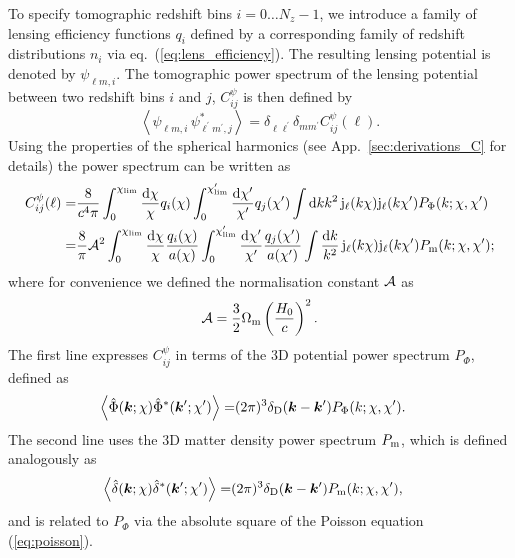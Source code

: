 \documentclass[fleqn,usenatbib]{mnras} %
\newcommand{\pref}{{\cal A}}
\renewcommand{\vec}{\bm}
\begin{document}
To specify tomographic redshift bins $i=0\ldots N_z-1$, we introduce a family
of lensing efficiency functions $q_i$ defined by a corresponding family of
redshift distributions $n_i$ via eq.~(\ref{eq:lens_efficiency}). The resulting
lensing potential is denoted by $\psi_{\ell m, i}$. The tomographic power
spectrum of the lensing potential between two redshift bins $i$ and $j$,
$C_{ij}^\psi$ is then defined by \cite{pee80}
%
\begin{equation}
  \left\langle \psi^{}_{\ell m, i} \, \psi^\ast_{\ell^\prime m^\prime, j} \right\rangle
    = \delta_{\ell \ell^\prime} \delta_{m m^\prime} C^\psi_{ij}(\ell) .
  \label{eq:C_ell_psi}
\end{equation}
%
Using the properties of the spherical harmonics (see
App.~\ref{sec:derivations_C} for details) the power spectrum can be written as
%
\begin{align}
  C_{ij}^\psi(\ell) = & \frac 8 {c^4 \pi} 
  \int_0^{\chi_{\rm lim}} \frac{{\rm d}\chi}{\chi} q_i(\chi)
  \int_0^{\chi^\prime_{\rm lim}} \frac{{\rm d}\chi^\prime}{\chi^\prime} q_j(\chi^\prime)
  \int {\rm d} k k^2 \, {\rm j}_\ell(k \chi) {\rm j}_\ell(k \chi^\prime) P_\Phi(k; \chi, \chi^\prime)
  \label{eq:C_ell_phi_Pphi} \\
  = & \frac 8 \pi \pref^2
  \int_0^{\chi_{\rm lim}} \frac{{\rm d}\chi}{\chi} \frac{q_i(\chi)}{a(\chi)}
  \int_0^{\chi^\prime_{\rm lim}} \frac{{\rm d}\chi^\prime}{\chi^\prime} \frac{q_j(\chi^\prime)}{a(\chi^\prime)}
  \int \frac{{\rm d} k}{k^2} \, {\rm j}_\ell(k \chi) {\rm j}_\ell(k \chi^\prime) P_{\rm m}(k; \chi, \chi^\prime) ;
  \label{eq:C_ell_phi_Pm}
\end{align}
%
where for convenience we defined the normalisation constant $\pref$ as
%
\begin{equation}
  \pref = \frac 3 2 \Omega_{\rm m} \left(\frac{H_0} c\right)^2.
  \label{eq:pref}
\end{equation}
%
The first line expresses $C_{ij}^\psi$ in terms of the 3D potential power spectrum $P_\Phi$, defined as
%
\begin{align}
  \left\langle \hat \Phi(\vec k; \chi) \hat \Phi^\ast(\vec k^\prime; \chi^\prime) \right\rangle
    = & (2\pi)^3 \delta_{\rm D}(\vec k - \vec k^\prime) P_\Phi(k; \chi, \chi^\prime).
  \label{eq:p_phi}
\end{align}
%
The second line uses the 3D matter density power spectrum $P_{\rm m}$, which is defined analogously as
%
\begin{align}
  \left\langle \hat \delta(\vec k; \chi) \hat \delta^\ast(\vec k^\prime; \chi^\prime) \right\rangle
    = & (2\pi)^3 \delta_{\rm D}(\vec k - \vec k^\prime) P_{\rm m}(k; \chi, \chi^\prime),
  \label{eq:p_m}
\end{align}
%
and is
related to $P_\Phi$ via the absolute square of the Poisson equation (\ref{eq:poisson}).
\end{document}
